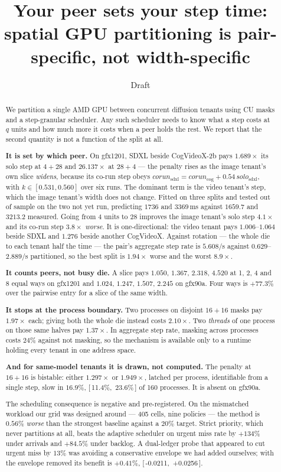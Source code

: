 \documentclass[sigconf,nonacm]{acmart}
\title{Your peer sets your step time: spatial GPU partitioning is
pair-specific, not width-specific}
\author{Draft}
\affiliation{\institution{Claims traced to
  \texttt{docs/claims-and-evidence.md}}\country{}}
\newcommand{\ci}[2]{[\,#1,\ #2\,]}
\begin{document}
\begin{abstract}
We partition a single AMD GPU between concurrent diffusion tenants using
CU masks and a step-granular scheduler. Any such scheduler needs to know
what a step costs at $q$ units and how much more it costs when a peer
holds the rest. We report that the second quantity is not a function of
the split at all.

\textbf{It is set by which peer.} On gfx1201, SDXL beside CogVideoX-2b
pays $1.689\times$ its solo step at $4{+}28$ and $26.137\times$ at
$28{+}4$ --- the penalty rises as the image tenant's own slice
\emph{widens}, because its co-run step obeys $\mathit{corun}_{\text{sdxl}}
= \mathit{corun}_{\text{cog}} + 0.54\,\mathit{solo}_{\text{sdxl}}$, with
$k \in [0.531, 0.560]$ over six runs. The dominant term is the video
tenant's step, which the image tenant's width does not change. Fitted on
three splits and tested out of sample on the two not yet run, predicting
$1736$ and $3369$\,ms against $1659.7$ and $3213.2$ measured. Going from
4 units to 28 improves the image tenant's solo step $4.1\times$ and its
co-run step $3.8\times$ \emph{worse}. It is one-directional: the video
tenant pays $1.006$--$1.064$ beside SDXL and $1.276$ beside another
CogVideoX. Against rotation --- the whole die to each tenant half the
time --- the pair's aggregate step rate is $5.608$/s against
$0.629$--$2.889$/s partitioned, so the best split is $1.94\times$ worse
and the worst $8.9\times$.

\textbf{It counts peers, not busy die.} A slice pays $1.050$, $1.367$,
$2.318$, $4.520$ at 1, 2, 4 and 8 equal ways on gfx1201 and $1.024$,
$1.247$, $1.507$, $2.245$ on gfx90a. Four ways is $+77.3\%$ over the
pairwise entry for a slice of the same width.

\textbf{It stops at the process boundary.} Two processes on disjoint
$16{+}16$ masks pay $1.97\times$ each; giving both the whole die instead
costs $2.10\times$. Two \emph{threads} of one process on those same
halves pay $1.37\times$. In aggregate step rate, masking across processes
costs $24\%$ against not masking, so the mechanism is available only to a
runtime holding every tenant in one address space.

\textbf{And for same-model tenants it is drawn, not computed.} The
penalty at $16{+}16$ is bistable: either $1.297\times$ or $1.949\times$,
latched per process, identifiable from a single step, slow in $16.9\%$,
\ci{11.4\%}{23.6\%} of 160 processes. It is absent on gfx90a.

The scheduling consequence is negative and pre-registered. On the
mismatched workload our grid was designed around --- 405 cells, nine
policies --- the method is $0.56\%$ \emph{worse} than the strongest
baseline against a $20\%$ target. Strict priority, which never partitions
at all, beats the adaptive scheduler on urgent miss rate by $+134\%$
under arrivals and $+84.5\%$ under backlog. A dual-ledger probe that
appeared to cut urgent miss by $13\%$ was avoiding a conservative
envelope we had added ourselves; with the envelope removed its benefit is
$+0.41\%$, \ci{-0.0211}{+0.0256}.


\end{abstract}
\end{document}
